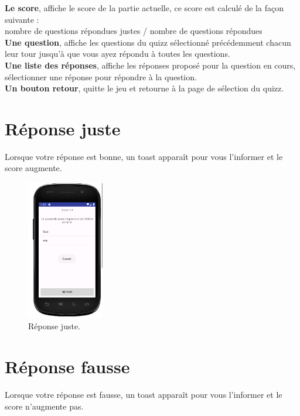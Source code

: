 \documentclass[a4paper]{report}
\begin{document}
\textbf{Le score}, affiche le score de la partie actuelle, ce score est calculé de la façon suivante : \\
nombre de questions répondues justes / nombre de questions répondues \\
\textbf{Une question}, affiche les questions du quizz sélectionné précédemment chacun leur tour jusqu'à que vous ayez répondu à toutes les questions. \\
\textbf{Une liste des réponses}, affiche les réponses proposé pour la question en cours, sélectionner une réponse pour répondre à la question. \\
\textbf{Un bouton retour}, quitte le jeu et retourne à la page de sélection du quizz.\\


\newpage
\section{Réponse juste}
Lorsque votre réponse est bonne, un toast apparaît pour vous l'informer et le score augmente.

\begin{figure}[h]
\centering
\includegraphics[width=0.3\textwidth]{reponseJuste.png}
\caption{\label{fig:Réponse juste}Réponse juste.}
\end{figure}


\newpage
\section{Réponse fausse}
Lorsque votre réponse est fausse, un toast apparaît pour vous l'informer et le score n'augmente pas.
\end{document}
